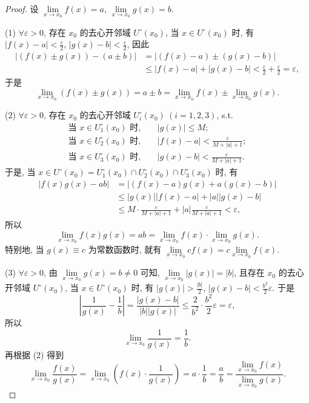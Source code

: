 \begin{proof}
设 $\lim\limits_{x\to x_0}f(x)=a$, $\lim\limits_{x\to x_0}g(x)=b$.

(1) $\forall \varepsilon > 0$, 存在 $x_0$ 的去心开邻域 $U^\circ(x_0)$, 当 $x \in U^\circ(x_0)$ 时, 有 $|f(x) - a| < \frac{\varepsilon}{2}$, $|g(x) - b| < \frac{\varepsilon}{2}$, 因此
\begin{align*}
|(f(x)\pm g(x))-(a\pm b)| &= |(f(x)-a)\pm(g(x)-b)| \\
&\leqslant |f(x)-a|+|g(x)-b|<\frac{\varepsilon}{2}+\frac{\varepsilon}{2}=\varepsilon,
\end{align*}
于是
\[
\lim_{x\to x_{0}}(f(x)\pm g(x))=a\pm b=\lim_{x\to x_{0}}f(x)\pm\lim_{x\to x_{0}}g(x).
\]

(2) $\forall\varepsilon>0$, 存在 $x_{0}$ 的去心开邻域 $U_{i}^{\circ}(x_{0})\ (i=1,2,3)$, s.t.
\begin{align*}
\text{当 } x \in U_{1}^{\circ}(x_{0}) \text{ 时},&\quad |g(x)| \leqslant M; \\
\text{当 } x \in U_{2}^{\circ}(x_{0}) \text{ 时},&\quad |f(x)-a| < \frac{\varepsilon}{M+|a|+1}; \\
\text{当 } x \in U_3^\circ(x_0) \text{ 时},&\quad |g(x)-b| < \frac{\varepsilon}{M+|a|+1}.
\end{align*}
于是, 当 $x \in U^{\circ}(x_{0}) = U_{1}^{\circ}(x_{0}) \cap U_{2}^{\circ}(x_{0}) \cap U_{3}^{\circ}(x_{0})$ 时, 有
\begin{align*}
|f(x)g(x)-ab| &= |(f(x)-a)g(x)+a(g(x)-b)| \\
&\leqslant |g(x)||f(x)-a|+|a||g(x)-b| \\
&\leqslant M\cdot\frac{\varepsilon}{M+|a|+1}+|a|\frac{\varepsilon}{M+|a|+1} < \varepsilon,
\end{align*}
所以
\[
\lim_{x\to x_{0}}f(x)g(x)=ab=\lim_{x\to x_{0}}f(x)\cdot\lim_{x\to x_{0}}g(x).
\]
特别地, 当 $g(x) \equiv c$ 为常数函数时, 就有 $\lim\limits_{x \to x_0} c f(x) = c \lim\limits_{x \to x_0} f(x)$.

(3) $\forall\varepsilon>0$, 由 $\lim\limits_{x\to x_0}g(x)=b\neq0$ 可知, $\lim\limits_{x\to x_0}|g(x)|=|b|$, 且存在 $x_0$ 的去心开邻域 $U^\circ(x_0)$, 当 $x\in U^\circ(x_0)$ 时, 有 $|g(x)|>\frac{|b|}{2}$, $|g(x)-b|<\frac{b^2}{2}\varepsilon$. 于是
\[
\left|\frac{1}{g(x)}-\frac{1}{b}\right|=\frac{|g(x)-b|}{|b||g(x)|}\leqslant\frac{2}{b^2}\cdot\frac{b^2}{2}\varepsilon=\varepsilon,
\]
所以
\[
\lim_{x\to x_{0}}\frac{1}{g(x)}=\frac{1}{b}.
\]
再根据 (2) 得到
\[
\lim_{x\to x_{0}}\frac{f(x)}{g(x)}=\lim_{x\to x_{0}}\left(f(x)\cdot\frac{1}{g(x)}\right)=a\cdot\frac{1}{b}=\frac{a}{b}=\frac{\lim\limits_{x\to x_{0}}f(x)}{\lim\limits_{x\to x_{0}}g(x)}.
\]
\end{proof}

